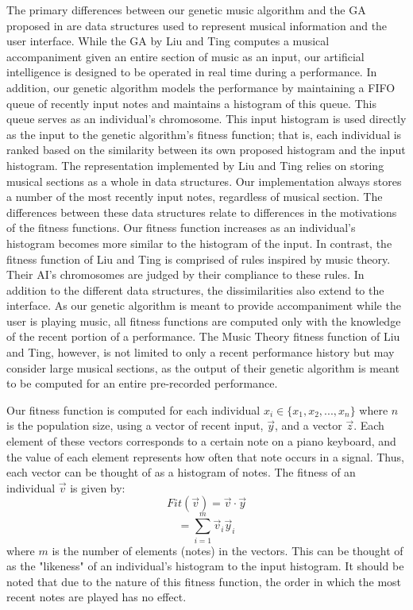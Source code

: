 \documentclass[conference]{IEEEtran}
\begin{document}
The primary differences between our genetic music algorithm and the GA proposed in \cite{b1} are data structures used to represent musical information and the user interface. While the GA by Liu and Ting computes a musical accompaniment given an entire section of music as an input, our artificial intelligence is designed to be operated in real time during a performance. In addition, our genetic algorithm models the performance by maintaining a FIFO queue of recently input notes and maintains a histogram of this queue. This queue serves as an individual's chromosome.  This input histogram is used directly as the input to the genetic algorithm's fitness function; that is, each individual is ranked based on the similarity between its own proposed histogram and the input histogram.
The representation implemented by Liu and Ting relies on storing musical sections as a whole in data structures\cite{b1}.  Our implementation always stores a number of the most recently input notes, regardless of musical section. The differences between these data structures relate to differences in the motivations of the fitness functions. Our fitness function increases as an individual's histogram becomes more similar to the histogram of the input. In contrast, the fitness function of Liu and Ting is comprised of rules inspired by music theory. Their AI's chromosomes are judged by their compliance to these rules\cite{b1}.
In addition to the different data structures, the dissimilarities also extend to the interface. As our genetic algorithm is meant to provide accompaniment while the user is playing music, all fitness functions are computed only with the knowledge of the recent portion of a performance. The Music Theory fitness function of Liu and Ting, however, is not limited to only a recent performance history but may consider large musical sections, as the output of their genetic algorithm is meant to be computed for an entire pre-recorded performance. 

Our fitness function is computed for each individual
$x_{i} \in \{x_{1},x_{2},...,x_{n}\} $ where $n$ is the population size, using
a vector of recent input, $\vec{y}$, and a vector $\vec{z}$. Each element of these
vectors corresponds to a certain note on a piano keyboard, and the value of
each element represents how often that note occurs in a signal. Thus, each vector
can be thought of as a histogram of notes. The fitness of an individual $\vec{v}$ is given by:
\[ Fit(\vec{v}) = \vec{v}\cdot\vec{y} \]
\[  = \sum_{i=1}^m \vec{v}_{i}\vec{y}_{i} \]
where $m$ is the number of elements (notes) in the vectors. This can be thought of as the "likeness" of an individual's histogram to
the input histogram. It should be noted that due to the nature of this fitness function, the order in which the most recent notes are played has no effect.
\end{document}
